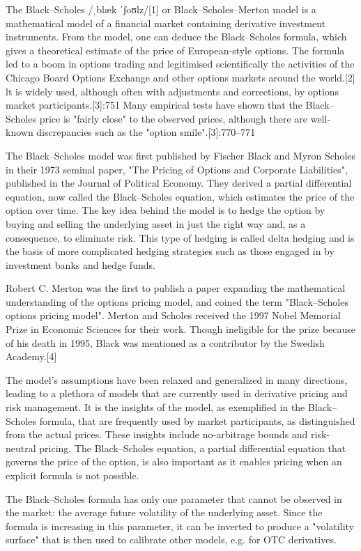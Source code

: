 The Black–Scholes /ˌblæk ˈʃoʊlz/[1] or Black–Scholes–Merton model is a mathematical model of a financial market containing derivative investment instruments. From the model, one can deduce the Black–Scholes formula, which gives a theoretical estimate of the price of European-style options. The formula led to a boom in options trading and legitimised scientifically the activities of the Chicago Board Options Exchange and other options markets around the world.[2] lt is widely used, although often with adjustments and corrections, by options market participants.[3]:751 Many empirical tests have shown that the Black–Scholes price is "fairly close" to the observed prices, although there are well-known discrepancies such as the "option smile".[3]:770–771

The Black–Scholes model was first published by Fischer Black and Myron Scholes in their 1973 seminal paper, "The Pricing of Options and Corporate Liabilities", published in the Journal of Political Economy. They derived a partial differential equation, now called the Black–Scholes equation, which estimates the price of the option over time. The key idea behind the model is to hedge the option by buying and selling the underlying asset in just the right way and, as a consequence, to eliminate risk. This type of hedging is called delta hedging and is the basis of more complicated hedging strategies such as those engaged in by investment banks and hedge funds.

Robert C. Merton was the first to publish a paper expanding the mathematical understanding of the options pricing model, and coined the term "Black–Scholes options pricing model". Merton and Scholes received the 1997 Nobel Memorial Prize in Economic Sciences for their work. Though ineligible for the prize because of his death in 1995, Black was mentioned as a contributor by the Swedish Academy.[4]

The model's assumptions have been relaxed and generalized in many directions, leading to a plethora of models that are currently used in derivative pricing and risk management. It is the insights of the model, as exemplified in the Black–Scholes formula, that are frequently used by market participants, as distinguished from the actual prices. These insights include no-arbitrage bounds and risk-neutral pricing. The Black–Scholes equation, a partial differential equation that governs the price of the option, is also important as it enables pricing when an explicit formula is not possible.

The Black–Scholes formula has only one parameter that cannot be observed in the market: the average future volatility of the underlying asset. Since the formula is increasing in this parameter, it can be inverted to produce a "volatility surface" that is then used to calibrate other models, e.g. for OTC derivatives.
